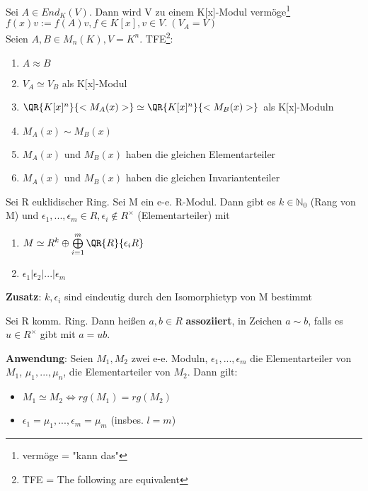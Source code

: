 \begin{theorem}
Sei $A \in End_K(V)$. Dann wird V zu einem K[x]-Modul vermöge\footnote{vermöge = "kann das"} $f(x)v := f(A)v, f\in K[x], v \in V.~(V_A=V)$\\
Seien $A,B \in M_n(K), V=K^n$. TFE\footnote{TFE = The following are equivalent}:
\begin{enumerate}
	\item $A \approx B$
	\item $V_A \simeq V_B$ als K[x]-Modul
	\item $\QR{K[x]^n}{<M_A(x)>} \simeq \QR{K[x]^n}{<M_B(x)>}$ als K[x]-Moduln
	\item $M_A(x) \sim M_B(x)$
	\item $M_A(x)$ und $M_B(x)$ haben die gleichen Elementarteiler
	\item $M_A(x)$ und $M_B(x)$ haben die gleichen Invariantenteiler
\end{enumerate}
\end{theorem}

\begin{theorem}
Sei R euklidischer Ring. Sei M ein e-e. R-Modul. Dann gibt es $k \in \mathbb{N}_0$ (Rang von M) und $\epsilon_1,...,\epsilon_m \in R, \epsilon_i \notin R^\times$ (Elementarteiler) mit
\begin{enumerate}
	\item $M \simeq R^k \oplus \bigoplus \limits_{i=1}^m \QR{R}{\epsilon_i R}$
	\item $\epsilon_1 | \epsilon_2 | ... | \epsilon_m$
\end{enumerate}
\textbf{Zusatz}: $k,\epsilon_i$ sind eindeutig durch den Isomorphietyp von M bestimmt
\end{theorem}

\begin{remark}
Sei R komm. Ring. Dann heißen $a,b \in R$ \textbf{assoziiert}, in Zeichen $a \sim b$, falls es $u \in R^\times$ gibt mit $a=ub$.

\textbf{Anwendung}: Seien $M_1,M_2$ zwei e-e. Moduln, $\epsilon_1,...,\epsilon_m$ die Elementarteiler von $M_1$, $\mu_1,...,\mu_n$, die Elementarteiler von $M_2$. Dann gilt:
\begin{itemize}
	\item $M_1 \simeq M_2 \Leftrightarrow rg(M_1) = rg(M_2)$
	\item $\epsilon_1 = \mu_1,...,\epsilon_m = \mu_m$ (insbes. $l=m$) %
\end{itemize}
\end{remark}

